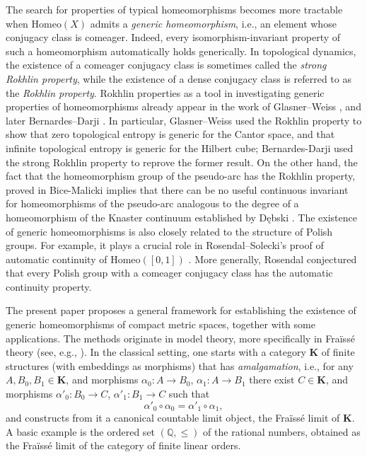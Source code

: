 \documentclass[12pt]{amsart}
\numberwithin{equation}{section}
\theoremstyle{plain}
\theoremstyle{definition}
\newcommand \Homeo{ \mbox{Homeo}}
\newcommand \KKb{\mathbf{K}}
\newcommand \QQ{\mathbb{Q}}
\begin{document}
The search for properties of typical homeomorphisms becomes more tractable when $\Homeo(X)$ admits a \emph{generic homeomorphism}, i.e., an element whose conjugacy class is comeager. Indeed, every isomorphism-invariant property of such a homeomorphism automatically holds generically. In topological dynamics, the existence of a comeager conjugacy class is sometimes called the \emph{strong Rokhlin property}, while the existence of a dense conjugacy class is referred to as the \emph{Rokhlin property}. Rokhlin properties as a tool in investigating generic properties of homeomorphisms already appear in the work of Glasner--Weiss \cite{GlWe}, and later Bernardes--Darji \cite{BeDa}. In particular, Glasner--Weiss used the Rokhlin property to show that zero topological entropy is generic for the Cantor space, and that infinite topological entropy is generic for the Hilbert cube; Bernardes-Darji used the strong Rokhlin property to reprove the former result. On the other hand, the fact that the homeomorphism group of the pseudo-arc has the Rokhlin property, proved in Bice-Malicki \cite{BiMa} implies that there can be no useful continuous invariant for homeomorphisms of the pseudo-arc analogous to the degree of a homeomorphism of the Knaster continuum established by Dębski \cite{De}.  The existence of generic homeomorphisms is also closely related to the structure of Polish groups. For example, it plays a crucial role in Rosendal--Solecki's proof of automatic continuity of $\Homeo([0,1])$ \cite{RoSo}. More generally, Rosendal conjectured that every Polish group with a comeager conjugacy class has the automatic continuity property.

The present paper proposes a general framework for establishing the existence of generic homeomorphisms of compact metric spaces, together with some applications. The methods originate in model theory, more specifically in Fra\"iss\'e theory (see, e.g., \cite{Fr}). In the classical setting, one starts with a category $\KKb$ of finite structures (with embeddings as morphisms) that has \emph{amalgamation}, i.e., for any $A,B_0,B_1 \in \KKb$, and morphisms $\alpha_0: A \to B_0$, $\alpha_1: A \to B_1$ there exist $C \in \KKb$, and morphisms $\alpha'_0: B_0 \to C$, $\alpha'_1: B_1 \to C$ such that $$\alpha'_0 \circ \alpha_0=\alpha'_1 \circ \alpha_1,$$ and constructs from it a canonical countable limit object, the Fra\"iss\'e limit of $\KKb$. A basic example is the ordered set $(\QQ,\leq)$ of the rational numbers, obtained as the Fra\"iss\'e limit of the category of finite linear orders.
\end{document}
